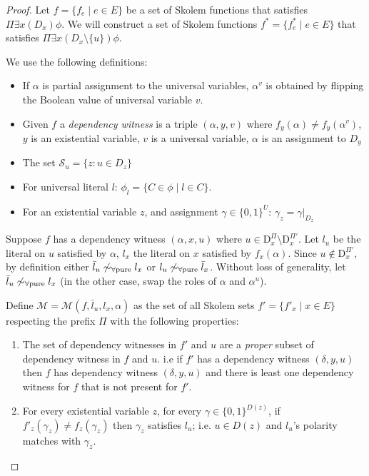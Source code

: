 \documentclass[runningheads]{llncs}
\newcommand{\mpool}{\mathcal{M}}
\newcommand{\pusim}{\ensuremath{\sim_{\mbox{\scriptsize \upshape $\forall$pure}}}}
\begin{document}
	\begin{proof}
		Let $f=\{ f_e \mid e\in E\}$ be a set of Skolem functions that satisfies $\Pi\exists x(D_x) \phi$. 
		We will construct a set of Skolem functions $f^*=\{ f^*_e \mid e\in E\}$ that satisfies $\Pi\exists x(D_x\setminus\{u\}) \phi$.
		
		We use the following definitions:
		\begin{itemize}
		\item If $\alpha$ is partial assignment to the universal variables, $\alpha^v$ is obtained by flipping the Boolean value of universal variable $v$.		
		\item Given $f$ a \emph{dependency witness} is a  triple $(\alpha, y, v)$ where $f_y(\alpha)\neq  f_y(\alpha^v)$, $y$ is an existential variable, $v$ is a universal variable, $\alpha$ is an assignment to $D_y$
		\item The set $\mathcal{S}_u=\{z:u \in D_z\}$
		\item For universal literal $l$: $\phi_l= \{C \in \phi \mid l\in C\}$.
		\item For an existential variable $z$, and assignment $\gamma\in \{0,1\}^U$: $\gamma_z= \gamma|_{D_{z}}$
		\end{itemize}
		
		
		Suppose $f$ has a dependency witness $(\alpha, x, u)$ where $u \in \mathrm{D}_x^\Pi \setminus \mathrm{D}_x^{\Pi'}$.
		Let $l_u$ be the literal on $u$ satisfied by $\alpha$, $l_x$ the literal on $x$ satisfied by $f_x(\alpha)$.
		Since $u \not \in \mathrm{D}_x^{\Pi'}$, by definition either $\bar l_u \not\pusim l_x$ or $l_u \not\pusim \bar l_x$.
		Without loss of generality, let $\bar l_u \not\pusim l_x$ (in the other case, swap the roles of $\alpha$ and $\alpha^u$).
		
		Define $\mpool = \mpool(f, \bar l_u, l_x, \alpha)$ as the set of all Skolem sets $f'=\{f'_x \mid  x\in E\}$ respecting the prefix $\Pi$ with the following properties:
		\begin{enumerate}
			\item The set of dependency witnesses in $f'$ and $u$ are a \emph{proper} subset of dependency witness in $f$ and $u$. i.e if $f'$ has a dependency witness $(\delta, y,u)$ then $f$ has dependency witness $(\delta, y,u)$ and there is least one dependency witness for $f$ that is not present for $f'$.
			\label{item:hairiness}
			\item For every existential variable $z$, for every
			$ \gamma \in \{0,1\}^{D(z)}$, if  
			 $f'_z (\gamma_z) \neq f_z(\gamma_z)$  then $\gamma_z$ satisfies $l_u$; i.e. $u\in D(z)$ and $l_u$'s polarity matches with $\gamma_z$.
	

\end{enumerate}
\end{proof}
\end{document}
